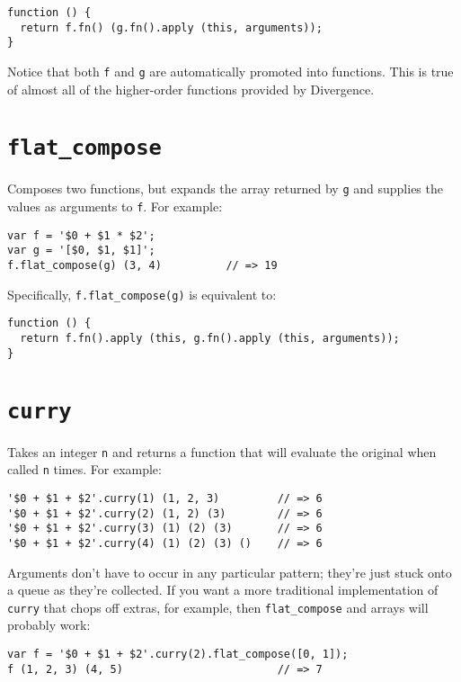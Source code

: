 \documentclass{report}
\begin{document}
\begin{verbatim}
function () {
  return f.fn() (g.fn().apply (this, arguments));
}
\end{verbatim}
      
      Notice that both \verb|f| and \verb|g| are automatically promoted into functions. This is true of almost all of the higher-order functions provided by Divergence.

\section {{\tt flat\_compose}}
      \label{sec:flat-compose}
      Composes two functions, but expands the array returned by \verb|g| and supplies the values as arguments to \verb|f|. For example:

\begin{verbatim}
var f = '$0 + $1 * $2';
var g = '[$0, $1, $1]';
f.flat_compose(g) (3, 4)          // => 19
\end{verbatim}

      Specifically, \verb|f.flat_compose(g)| is equivalent to:

\begin{verbatim}
function () {
  return f.fn().apply (this, g.fn().apply (this, arguments));
}
\end{verbatim}

\section {{\tt curry}}
      \label{sec:curry}
      Takes an integer \verb|n| and returns a function that will evaluate the original when called \verb|n| times. For example:

\begin{verbatim}
'$0 + $1 + $2'.curry(1) (1, 2, 3)         // => 6
'$0 + $1 + $2'.curry(2) (1, 2) (3)        // => 6
'$0 + $1 + $2'.curry(3) (1) (2) (3)       // => 6
'$0 + $1 + $2'.curry(4) (1) (2) (3) ()    // => 6
\end{verbatim}

      Arguments don't have to occur in any particular pattern; they're just stuck onto a queue as they're collected. If you want a more traditional implementation of \verb|curry| that chops
      off extras, for example, then \verb|flat_compose| and arrays will probably work:

\begin{verbatim}
var f = '$0 + $1 + $2'.curry(2).flat_compose([0, 1]);
f (1, 2, 3) (4, 5)                        // => 7
\end{verbatim}
\end{document}
